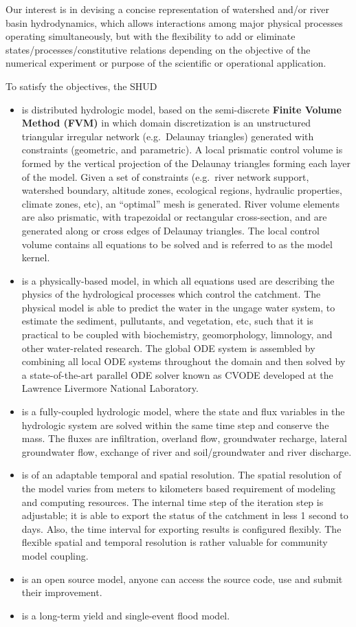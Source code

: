 \documentclass[]{scrbook}
\providecommand{\tightlist}{%
  \setlength{\itemsep}{0pt}\setlength{\parskip}{0pt}}
\begin{document}
Our interest is in devising a concise representation of watershed and/or
river basin hydrodynamics, which allows interactions among major
physical processes operating simultaneously, but with the flexibility to
add or eliminate states/processes/constitutive relations depending on
the objective of the numerical experiment or purpose of the scientific
or operational application.

To satisfy the objectives, the SHUD

\begin{itemize}
\tightlist
\item
  is distributed hydrologic model, based on the semi-discrete
  \textbf{Finite Volume Method (FVM)} in which domain discretization is
  an unstructured triangular irregular network (e.g.~Delaunay triangles)
  generated with constraints (geometric, and parametric). A local
  prismatic control volume is formed by the vertical projection of the
  Delaunay triangles forming each layer of the model. Given a set of
  constraints (e.g.~river network support, watershed boundary, altitude
  zones, ecological regions, hydraulic properties, climate zones, etc),
  an ``optimal'' mesh is generated. River volume elements are also
  prismatic, with trapezoidal or rectangular cross-section, and are
  generated along or cross edges of Delaunay triangles. The local
  control volume contains all equations to be solved and is referred to
  as the model kernel.
\item
  is a physically-based model, in which all equations used are
  describing the physics of the hydrological processes which control the
  catchment. The physical model is able to predict the water in the
  ungage water system, to estimate the sediment, pullutants, and
  vegetation, etc, such that it is practical to be coupled with
  biochemistry, geomorphology, limnology, and other water-related
  research. The global ODE system is assembled by combining all local
  ODE systems throughout the domain and then solved by a
  state-of-the-art parallel ODE solver known as CVODE developed at the
  Lawrence Livermore National Laboratory.
\item
  is a fully-coupled hydrologic model, where the state and flux
  variables in the hydrologic system are solved within the same time
  step and conserve the mass. The fluxes are infiltration, overland
  flow, groundwater recharge, lateral groundwater flow, exchange of
  river and soil/groundwater and river discharge.
\item
  is of an adaptable temporal and spatial resolution. The spatial
  resolution of the model varies from meters to kilometers based
  requirement of modeling and computing resources. The internal time
  step of the iteration step is adjustable; it is able to export the
  status of the catchment in less 1 second to days. Also, the time
  interval for exporting results is configured flexibly. The flexible
  spatial and temporal resolution is rather valuable for community model
  coupling.
\item
  is an open source model, anyone can access the source code, use and
  submit their improvement.
\item
  is a long-term yield and single-event flood model.
\end{itemize}
\end{document}
